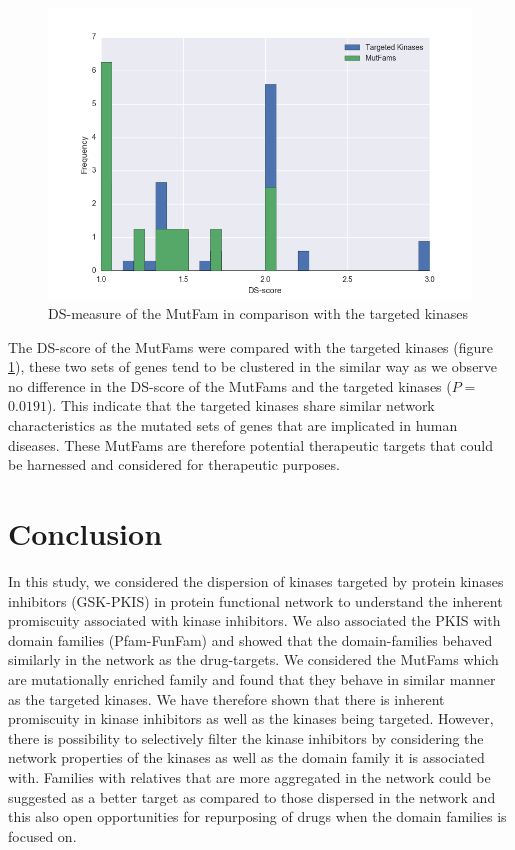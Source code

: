 \documentclass[a4paper, 11pt]{report}
\begin{document}
\begin{figure}[H]
	\includegraphics[width=\linewidth]{figures/muttarg.png}
	\centering
	\caption{DS-measure of the MutFam in comparison with the targeted kinases}
	\label{muttarg}
\end{figure}
The DS-score of the MutFams were compared with the targeted kinases (figure \ref{muttarg}), these two sets of genes tend to be clustered in the similar way as we observe no difference in the DS-score of the MutFams and the targeted kinases ($P=$ $0.0191$). This indicate that the targeted kinases share similar network characteristics as the mutated sets of genes that are implicated in human diseases. These MutFams are therefore potential therapeutic targets that could be harnessed and considered for therapeutic purposes.
\section{Conclusion}
In this study, we considered the dispersion of kinases targeted by protein kinases inhibitors (GSK-PKIS) in protein functional network to understand the inherent promiscuity associated with kinase inhibitors. We also associated the PKIS with domain families (Pfam-FunFam) and showed that the domain-families behaved similarly in the network as the drug-targets. We considered the MutFams which are mutationally enriched family and found that they behave in similar manner as the targeted kinases. We have therefore shown that there is inherent promiscuity in kinase inhibitors as well as the kinases being targeted. However, there is possibility to selectively filter the kinase inhibitors by considering the network properties of the kinases as well as the domain family it is associated with. Families with relatives that are more aggregated in the network could be suggested as a better target as compared to those dispersed in the network and this also open opportunities for repurposing of drugs when the domain families is focused on.
\end{document}
